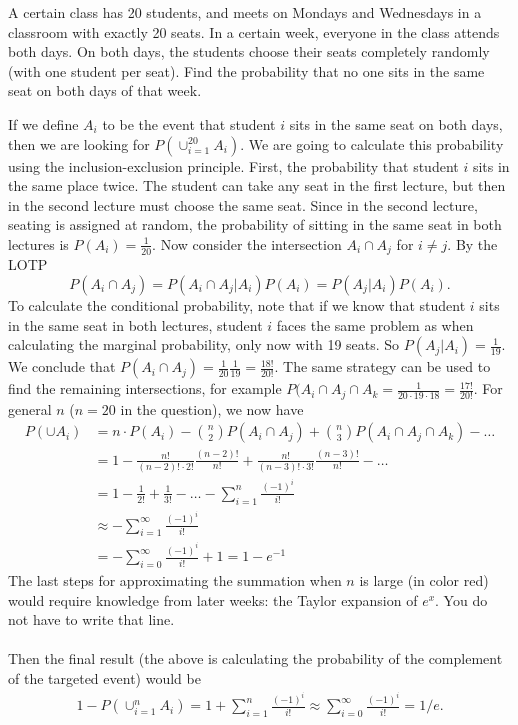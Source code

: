 
\setcounter{theorem}{24}
\begin{exercise}[BH.1.52]
	A certain class has 20 students, and meets on Mondays and Wednesdays in a classroom with exactly 20 seats. In a certain week, everyone in the class attends both days. On both days, the students choose their seats completely randomly (with one student per seat). Find the probability that no one sits in the same seat on both days of that week.
\begin{solution}
	If we define $A_{i}$ to be the event that student $i$ sits in the same seat on both days, then we are looking for
	$P(\cup_{i=1}^{20}A_{i})$. We are going to calculate this probability using the inclusion-exclusion principle. First, the probability that student $i$ sits in the same place twice. The student can take any seat in the first lecture, but then in the second lecture must choose the same seat. Since in the second lecture, seating is assigned at random, the probability of sitting in the same seat in both lectures is $P(A_{i})=\frac{1}{20}$. Now consider the intersection $A_{i}\cap A_{j}$ for $i\neq j$. By the LOTP $$P(A_{i}\cap A_{j}) = P(A_{i}\cap A_{j}|A_{i})P(A_{i})=P(A_{j}|A_{i})P(A_{i}).$$ To calculate the conditional probability, note that if we know that student $i$ sits in the same seat in both lectures, student $i$ faces the same problem as when calculating the marginal probability, only now with 19 seats. So $P(A_{j}|A_{i}) = \frac{1}{19}$. We conclude that $P(A_{i}\cap A_{j})=\frac{1}{20}\frac{1}{19} = \frac{18!}{20!}$. The same strategy can be used to find the remaining intersections, for example $P(A_{i}\cap A_{j}\cap A_{k} =\frac{1}{20\cdot 19\cdot 18} = \frac{17!}{20!}$. For general $n$ ($n=20$ in the question), we now have
	\begin{align*}
		P(\cup A_{i}) &= n\cdot P(A_{i}) - {n \choose 2}P(A_{i}\cap A_{j}) + {n \choose 3}P(A_{i}\cap A_{j}\cap A_{k})-\ldots\\
		& = 1 - \frac{n!}{(n-2)!\cdot 2!}\frac{(n-2)!}{n!} + \frac{n!}{(n-3)!\cdot 3!}\frac{(n-3)!}{n!} -\ldots\\
		& = 1-\frac{1}{2!}+\frac{1}{3!}-\ldots
		-\sum_{i=1}^{n} \frac{(-1)^{i}}{i!}\\
		& \approx -\sum_{i=1}^{\infty} \frac{(-1)^{i}}{i!}\\ 
		& = -\sum_{i=0}^{\infty} \frac{(-1)^{i}}{i!} +1 =1-e^{-1}
	\end{align*}
The last steps for approximating the summation when $n$ is large (in color red) would require knowledge from later weeks: the Taylor expansion of $e^x$. You do not have to write that line.\\~\\
Then the final result (the above is calculating the probability of the  complement of the targeted event) would be 
\begin{align*}
1-P(\cup_{i=1}^{n} A_{i}) = 1+ \sum_{i=1}^{n} \frac{(-1)^{i}}{i!} { \approx \sum_{i=0}^{\infty} \frac{(-1)^{i}}{i!} =1/e. }
\end{align*} 
\end{solution}
\end{exercise}


